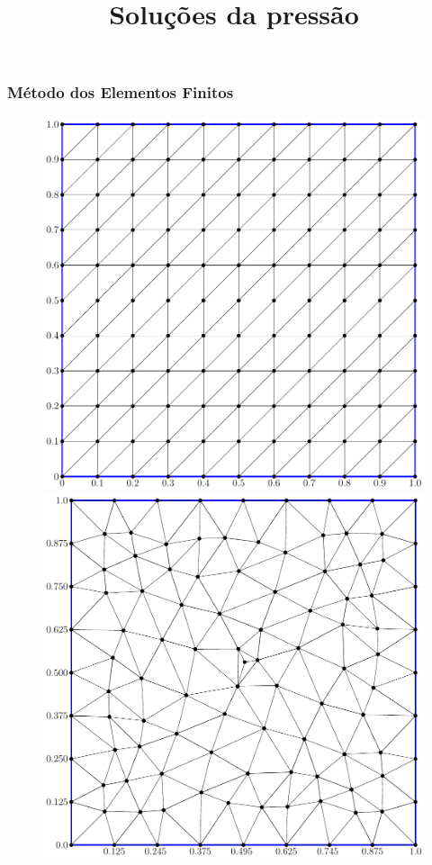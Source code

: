 \documentclass{beamer}
\begin{document}
\begin{frame}
  \frametitle{Método dos Elementos Finitos}
  
  \begin{figure}
    \title{Soluções da pressão}
    \begin{minipage}[t]{.49\textwidth}
      \centering
      \includegraphics[height=0.95\linewidth]{figure/structured_mesh.pdf}
    \end{minipage}
    \hfill
    \begin{minipage}[t]{.49\textwidth}
      \centering
      \includegraphics[height=0.95\linewidth]{figure/unstructured_mesh.pdf}
    \end{minipage}
  \end{figure}
\end{frame}
\end{document}
